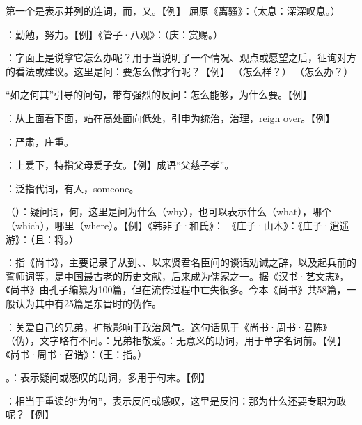 {
\item {}第一个是表示并列的连词，而，又。【例】 屈原《离骚》：（太息：深深叹息。）
\item {}：勤勉，努力。【例】《管子·八观》：（庆：赏赐。）
\item {}：字面上是说拿它怎么办呢？用于当说明了一个情况、观点或愿望之后，征询对方的看法或建议。这里是问：要怎么做才行呢？【例】 （怎么样？） （怎么办？）

“如之何其”引导的问句，带有强烈的反问：怎么能够，为什么要。【例】 
\item {}：从上面看下面，站在高处面向低处，引申为统治，治理，reign over。【例】 
\item {}：严肃，庄重。
\item {}：上爱下，特指父母爱子女。【例】成语“父慈子孝”。
}
{}


{
\item {}：泛指代词，有人，someone。
\item {}（）：疑问词，何，这里是问为什么（why），也可以表示什么（what），哪个（which），哪里（where）。【例】《韩非子·和氏》：  《庄子·山木》：《庄子·逍遥游》：（且：将。）
\item {}：指《尚书》，主要记录了从到、、以来贤君名臣间的谈话劝诫之辞，以及起兵前的誓师词等，是中国最古老的历史文献，后来成为儒家之一。据《汉书·艺文志》，《尚书》由孔子编纂为100篇，但在流传过程中亡失很多。今本《尚书》共58篇，一般认为其中有25篇是东晋时的伪作。
\item {}：关爱自己的兄弟，扩散影响于政治风气。这句话见于《尚书·周书·君陈》（伪），文字略有不同。：兄弟相敬爱。：无意义的助词，用于单字名词前。【例】《尚书·周书·召诰》：（王：指。）
\item {}。：表示疑问或感叹的助词，多用于句末。【例】   

：相当于重读的“为何”，表示反问或感叹，这里是反问：那为什么还要专职为政呢？【例】 
}
{}


